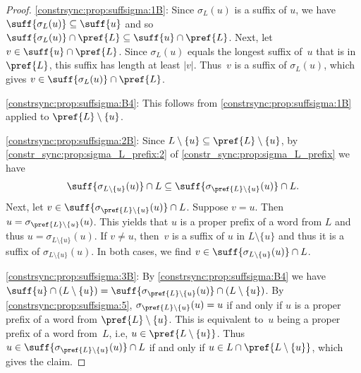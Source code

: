 \begin{proof}
	\ref{constrsync:prop:suffsigma:1B}: Since $\sigma_L(u)$ is a suffix of $u$,
	we have $\suff{\sigma_L(u)} \subseteq \suff{u}$
	and so $\suff{\sigma_L(u)} \cap \pref{L} \subseteq \suff{u} \cap \pref{L}$.
	Next, let $v \in \suff{u}\cap \pref{L}$.
	Since $\sigma_L(u)$ equals the longest suffix of~$u$ that is in $\pref{L}$,
	this suffix has length at least $|v|$. Thus~$v$
	is a suffix of $\sigma_L(u)$, which gives $v \in \suff{\sigma_L(u)} \cap \pref{L}$.	
	
	\ref{constrsync:prop:suffsigma:B4}: This follows from \cref{constrsync:prop:suffsigma:1B} 
	applied to $\pref{L}\setminus\{u\}$.
	
	\ref{constrsync:prop:suffsigma:2B}:
	Since $L \setminus \{u\} \subseteq \pref{L}\setminus\{u\}$, by \cref{constr_sync:prop:sigma_L_prefix:2} of \cref{constr_sync:prop:sigma_L_prefix} we have
	\[
	\suff{\sigma_{L\setminus \{u\}}(u)} \cap L \subseteq
	\suff{\sigma_{\pref{L}\setminus\{u\}}(u)} \cap L.
	\]
	Next, let $v \in \suff{\sigma_{\pref{L}\setminus\{u\}}(u)} \cap L$.
	Suppose $v = u$.
	Then $u = \sigma_{\pref{L}\setminus\{u\}}(u)$.
	This yields that $u$ is a proper prefix of a word from $L$
	and thus $u = \sigma_{L\setminus\{u\}}(u)$.
	If $v \ne u$, then~$v$ is a suffix of $u$ in $L \setminus\{u\}$
	and thus it is a suffix of $\sigma_{L\setminus\{u\}}(u)$.
	In both cases, we find $v \in \suff{\sigma_{L\setminus\{u\}}(u)} \cap L$.
	
	\ref{constrsync:prop:suffsigma:3B}:
	By \cref{constrsync:prop:suffsigma:B4} we have 
	$\suff{u}  \cap ( L \setminus \{u\} ) = \suff{\sigma_{\pref{L}\setminus\{u\}}(u)} \cap ( L \setminus \{u\} )$.
	By \cref{constrsync:prop:suffsigma:5},
	$\sigma_{\pref{L}\setminus\{u\}}(u) = u$
	if and only if $u$ is a proper prefix of a word from $\pref{L}\setminus\{u\}$.
	This is equivalent to~$u$ being a proper prefix of a word from~$L$, i.e,
	$u \in \pref{L \setminus \{u\}}$.
	Thus $u \in \suff{\sigma_{\pref{L}\setminus\{u\}}(u)} \cap L$
	if and only if $u \in L \cap \pref{L\setminus\{u\}}$,
	which gives the claim.
\end{proof}

